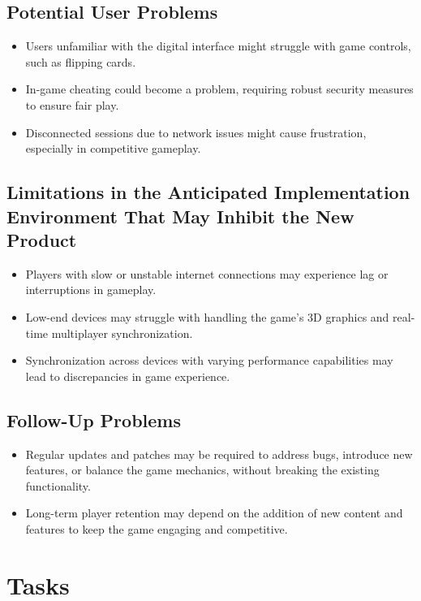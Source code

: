\documentclass{article}
\begin{document}
\subsection{Potential User Problems}
\begin{itemize}
    \item Users unfamiliar with the digital interface might struggle with game controls, such as flipping cards.
    \item In-game cheating could become a problem, requiring robust security measures to ensure fair play.
    \item Disconnected sessions due to network issues might cause frustration, especially in competitive gameplay.
\end{itemize}

\subsection{Limitations in the Anticipated Implementation Environment That May Inhibit the New Product}
\begin{itemize}
    \item Players with slow or unstable internet connections may experience lag or interruptions in gameplay.
    \item Low-end devices may struggle with handling the game’s 3D graphics and real-time multiplayer synchronization.
    \item Synchronization across devices with varying performance capabilities may lead to discrepancies in game experience.
\end{itemize}

\subsection{Follow-Up Problems}
\begin{itemize}
    \item Regular updates and patches may be required to address bugs, introduce new features, or balance the game mechanics, without breaking the existing functionality.
    \item Long-term player retention may depend on the addition of new content and features to keep the game engaging and competitive.
\end{itemize}

\section{Tasks}
\end{document}
